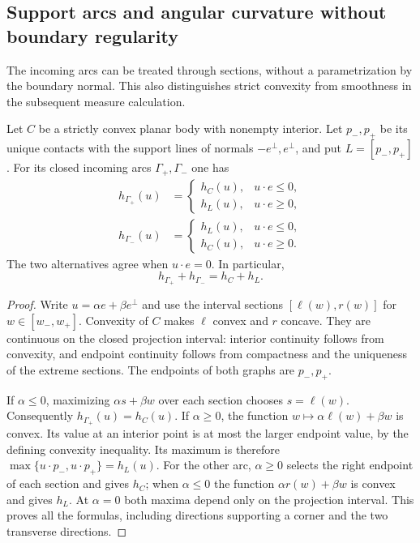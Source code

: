 \subsection{Support arcs and angular curvature without boundary regularity}
\label{subsec:nonsmooth-support-curvature}
The incoming arcs can be treated through sections, without a
parametrization by the boundary normal.  This also distinguishes
strict convexity from smoothness in the subsequent measure
calculation.

\begin{lemma}
\label{lem:nonsmooth-arc-support}
Let $C$ be a strictly convex planar body with nonempty interior.
Let $p_-,p_+$ be its unique contacts with the support lines of
normals $-e^\perp,e^\perp$, and put $L=[p_-,p_+]$.
For its closed incoming arcs $\Gamma_+,\Gamma_-$ one has
\begin{align}
 h_{\Gamma_+}(u)&=
 \begin{cases}h_C(u),&u\cdot e\le0,\\
                h_L(u),&u\cdot e\ge0,
 \end{cases}
 \label{eq:nonsmooth-plus-hemispheres}\\
 h_{\Gamma_-}(u)&=
 \begin{cases}h_L(u),&u\cdot e\le0,\\
                h_C(u),&u\cdot e\ge0.
 \end{cases}
 \label{eq:nonsmooth-minus-hemispheres}
\end{align}
The two alternatives agree when $u\cdot e=0$.  In particular,
\begin{equation}\label{eq:nonsmooth-arc-identity}
                  h_{\Gamma_+}+h_{\Gamma_-}=h_C+h_L.
\end{equation}
\end{lemma}
\begin{proof}
Write $u=\alpha e+\beta e^\perp$ and use the interval sections
$[\ell(w),r(w)]$ for $w\in[w_-,w_+]$.  Convexity of $C$ makes
$\ell$ convex and $r$ concave.  They are continuous on the
closed projection interval: interior continuity follows from
convexity, and endpoint continuity follows from compactness and
the uniqueness of the extreme sections.  The endpoints of both
graphs are $p_-,p_+$.

If $\alpha\le0$, maximizing $\alpha s+\beta w$ over each section
chooses $s=\ell(w)$.  Consequently
$h_{\Gamma_+}(u)=h_C(u)$.  If $\alpha\ge0$, the function
$w\mapsto\alpha\ell(w)+\beta w$ is convex.  Its value at an
interior point is at most the larger endpoint value, by the
defining convexity inequality.  Its maximum is therefore
$\max\{u\cdot p_-,u\cdot p_+\}=h_L(u)$.
For the other arc, $\alpha\ge0$ selects the right endpoint of
each section and gives $h_C$; when $\alpha\le0$ the function
$\alpha r(w)+\beta w$ is convex and gives $h_L$.
At $\alpha=0$ both maxima depend only on the projection interval.
This proves all the formulas, including directions supporting
a corner and the two transverse directions.
\end{proof}

